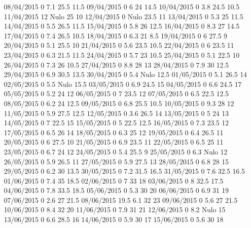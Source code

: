 08/04/2015  0      7.1    25.5   11.5 
09/04/2015  0      6      24     14.5 
10/04/2015  0      3.8    24.5   10.5 
11/04/2015  12    Nulo    25     10 
12/04/2015  0     Nulo    23.5   11 
13/04/2015  0      5.3    25     11.5 
14/04/2015  0      5.5    26.5   11.5 
15/04/2015  0      5.8    26     12.5 
16/04/2015  0      8.3    27     14.5 
17/04/2015  0      7.4    26.5   10.5 
18/04/2015  0      6.3    21     8.5 
19/04/2015  0      6      27.5   9 
20/04/2015  0      5.1    25.5   10 
21/04/2015  0      5.6    23.5   10.5 
22/04/2015  0      6      23.5   11 
23/04/2015  0      6.3    21.5   11.5 
24/04/2015  0      5.7    23     10.5 
25/04/2015  0      5.1    22.5   10 
26/04/2015  0      7.3    26     10.5 
27/04/2015  0      8.8    28     13 
28/04/2015  0      7.9    30     12.5 
29/04/2015  0      6.9    30.5   13.5 
30/04/2015  0      5.4   Nulo    12.5 
01/05/2015  0      5.1    26.5   14 
02/05/2015  0      5.5   Nulo    15.5 
03/05/2015  0      6.9    24.5   15 
04/05/2015  0      6.6    24.5   17 
05/05/2015  0      5.2    24     12 
06/05/2015  0      7      23.5   12 
07/05/2015  0      6.5    22.5   12.5 
08/05/2015  0      6.2    24     12.5 
09/05/2015  0      6.8    25.5   10.5 
10/05/2015  0      9.3    28     12 
11/05/2015  0      5.9    27.5   12.5 
12/05/2015  0      3.6    26.5   14 
13/05/2015  0      5      24     13 
14/05/2015  0      7      22.5   15 
15/05/2015  0      5      22.5   12.5 
16/05/2015  0      7.3    23.5   12 
17/05/2015  0      6.5    26     14 
18/05/2015  0      6.3    25     12 
19/05/2015  0      6.4    26.5   11 
20/05/2015  0      6      27.5   10 
21/05/2015  0      6.9    23.5   11 
22/05/2015  0      6.5    25     11 
23/05/2015  0      6.7    24     12 
24/05/2015  0      5.4    25.5   9 
25/05/2015  0      6.3   Nulo    12 
26/05/2015  0      5.9    26.5   11 
27/05/2015  0      5.9    27.5   13 
28/05/2015  0      6.8    28     15 
29/05/2015  0      6.2    30     13.5 
30/05/2015  0      7.2    31.5   16.5 
31/05/2015  0      7.6    32.5   16.5 
01/06/2015  0      7.4    35     18.5 
02/06/2015  0      7      33     18 
03/06/2015  0      8      32.5   17.5 
04/06/2015  0      7.8    33.5   18.5 
05/06/2015  0      5.3    30     20 
06/06/2015  0      6.9    31     19 
07/06/2015  0      2.6    27     21.5 
08/06/2015  19.5   6.1    32     23 
09/06/2015  0      5.6    27     21.5 
10/06/2015  0      8.4    32     20 
11/06/2015  0      7.9    31     21 
12/06/2015  0      8.2   Nulo    15 
13/06/2015  0      6.6    28.5   16 
14/06/2015  0      5.9    30     17 
15/06/2015  0      5.6    30     18 
